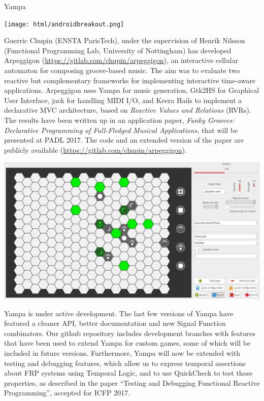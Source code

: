 \begin{hcarentry}[updated]{Yampa}
\begin{center}
\texttt{[image: html/androidbreakout.png]}
\end{center}

Guerric Chupin (ENSTA ParisTech), under the supervision of Henrik Nilsson
(Functional Programming Lab, University of Nottingham) has developed Arpeggigon
(\href{https://gitlab.com/chupin/arpeggigon}{https://gitlab.com/chupin/arpeggigon}),
an interactive cellular automaton for composing groove-based music. The aim was
to evaluate two reactive but complementary frameworks for implementing
interactive time-aware applications. Arpeggigon uses Yampa for music
generation, Gtk2HS for Graphical User Interface, jack for handling MIDI I/O,
and Keera Hails to implement a declarative MVC architecture, based on
\emph{Reactive Values and Relations} (RVRs).  The results have been written up
in an application paper, \emph{Funky Grooves: Declarative Programming of
Full-Fledged Musical Applications}, that will be presented at PADL 2017. The
code and an extended version of the paper are publicly available
(\href{https://gitlab.com/chupin/arpeggigon}{https://gitlab.com/chupin/arpeggigon}).

\begin{center}
\includegraphics[width=\linewidth]{arpeggigon.png}
\end{center}

Yampa is under active development. The last few versions of Yampa have featured
a cleaner API, better documentation and new Signal Function combinators. Our
github repository includes development branches with features that have been
used to extend Yampa for custom games, some of which will be included in future
versions. Furthermore, Yampa will now be extended with testing and debugging
features, which allow us to express temporal assertions about FRP systems using
Temporal Logic, and to use QuickCheck to test those properties, as described in
the paper ``Testing and Debugging Functional Reactive Programming'', accepted
for ICFP 2017.


\end{hcarentry}
